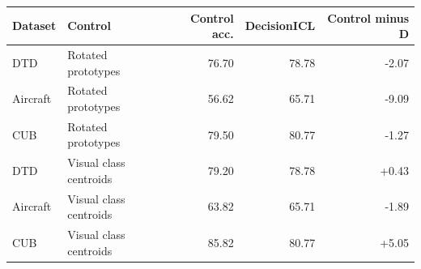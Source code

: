 \begin{tabular}{llrrr}
\toprule
Dataset & Control & Control acc. & DecisionICL & Control minus D \\
\midrule
DTD & Rotated prototypes & 76.70 & 78.78 & -2.07 \\
Aircraft & Rotated prototypes & 56.62 & 65.71 & -9.09 \\
CUB & Rotated prototypes & 79.50 & 80.77 & -1.27 \\
DTD & Visual class centroids & 79.20 & 78.78 & +0.43 \\
Aircraft & Visual class centroids & 63.82 & 65.71 & -1.89 \\
CUB & Visual class centroids & 85.82 & 80.77 & +5.05 \\
\bottomrule
\end{tabular}
